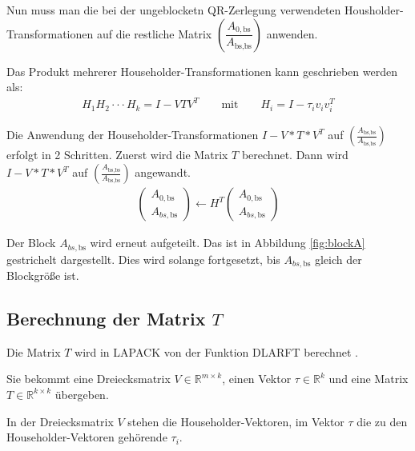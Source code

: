 Nun muss man die bei der ungeblocketn QR-Zerlegung verwendeten Housholder-Transformationen auf die restliche Matrix $ \left(\dfrac{A_{0, \text{bs}}}{A_{\text{bs}, \text{bs}}} \right)$ anwenden.

Das Produkt mehrerer Householder-Transformationen kann geschrieben werden als:
\begin{align*}
H_1H_2 \cdot \cdot \cdot H_k = I - VTV^T \qquad \text{mit}\qquad H_i = I - \tau_i v_iv_i^T
\end{align*}  \cite{Joffrain:2006:AHT:1141885.1141886}

Die Anwendung der Householder-Transformationen $I - V*T*V^T$ auf $\left(\frac{A_{\text{bs}, \text{bs}}}{A_{\text{bs}, \text{bs}}} \right)$ erfolgt in 2 Schritten. Zuerst wird  die Matrix $T$ berechnet. Dann wird $I - V*T*V^T$  auf $\left(\frac{A_{\text{bs}, \text{bs}}}{A_{\text{bs}, \text{bs}}} \right)$ angewandt.
\begin{align}
	\left(\begin{array}{l} 
	A_{0, \text{bs}} \\ \hline
	A_{bs, \text{bs}}
	\end{array}\right)
	\leftarrow
	H^T \left(\begin{array}{l} 
	A_{0, \text{bs}} \\ \hline
	A_{bs, \text{bs}}
	\end{array}\right)
\end{align}

Der Block $A_{bs, \text{bs}}$ wird erneut aufgeteilt. Das ist in Abbildung \ref{fig:blockA} gestrichelt dargestellt.
Dies wird solange fortgesetzt, bis $A_{bs, \text{bs}}$ gleich der Blockgröße ist.

\subsection{Berechnung der Matrix $T$}
Die Matrix $T$ wird in LAPACK von der Funktion \glqq DLARFT\grqq{} berechnet \cite{LARFT}.

Sie bekommt eine Dreiecksmatrix $V \in \mathbb{R}^{m \times k}$, einen Vektor $\tau \in \mathbb{R}^k$ und eine Matrix $T\in \mathbb{R}^{k\times k}$ übergeben. 

In der Dreiecksmatrix $V$ stehen die Householder-Vektoren,
im Vektor $\tau$ die zu den Householder-Vektoren gehörende $\tau_i$.

